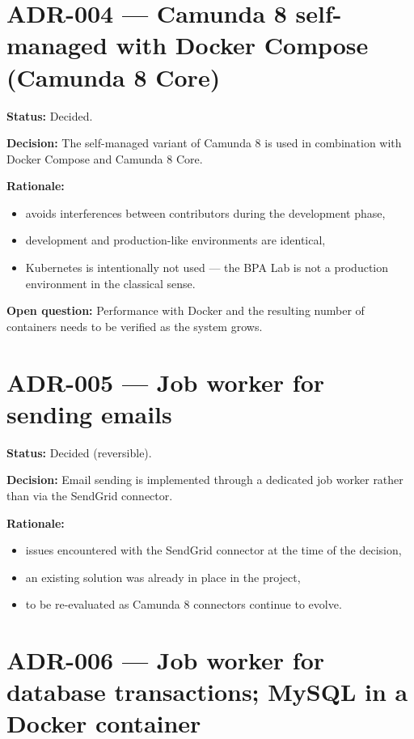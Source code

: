 \documentclass[
  english,
  11pt,
  a4paper,
]{scrbook}
\providecommand{\tightlist}{%
  \setlength{\itemsep}{0pt}\setlength{\parskip}{0pt}}
\begin{document}
\section{ADR-004 --- Camunda 8 self-managed with Docker Compose (Camunda
8
Core)}\label{adr-004-camunda-8-self-managed-with-docker-compose-camunda-8-core}

\textbf{Status:} Decided.

\textbf{Decision:} The self-managed variant of Camunda 8 is used in
combination with Docker Compose and Camunda 8 Core.

\textbf{Rationale:}

\begin{itemize}
\tightlist
\item
  avoids interferences between contributors during the development
  phase,
\item
  development and production-like environments are identical,
\item
  Kubernetes is intentionally not used --- the BPA Lab is not a
  production environment in the classical sense.
\end{itemize}

\textbf{Open question:} Performance with Docker and the resulting number
of containers needs to be verified as the system grows.

\section{ADR-005 --- Job worker for sending
emails}\label{adr-005-job-worker-for-sending-emails}

\textbf{Status:} Decided (reversible).

\textbf{Decision:} Email sending is implemented through a dedicated job
worker rather than via the SendGrid connector.

\textbf{Rationale:}

\begin{itemize}
\tightlist
\item
  issues encountered with the SendGrid connector at the time of the
  decision,
\item
  an existing solution was already in place in the project,
\item
  to be re-evaluated as Camunda 8 connectors continue to evolve.
\end{itemize}

\section{ADR-006 --- Job worker for database transactions; MySQL in a
Docker
container}\label{adr-006-job-worker-for-database-transactions-mysql-in-a-docker-container}
\end{document}
